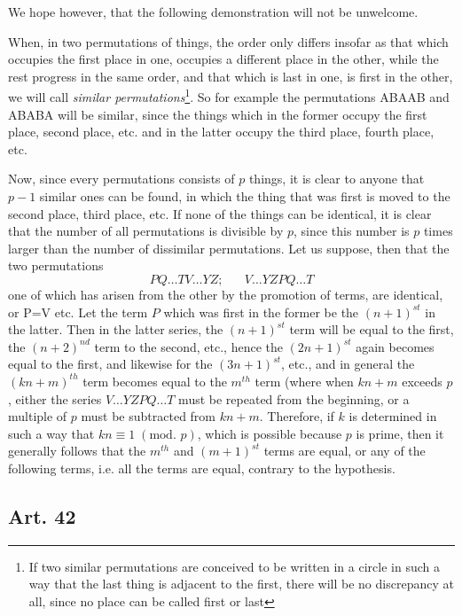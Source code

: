 \documentclass{book}
\theoremstyle{plain}
\theoremstyle{remark}
\begin{document}
We hope however, that the following demonstration will not be unwelcome. 

When, in two permutations of things, the order only differs insofar as that which occupies the first place in one, occupies a different place in the other, while the rest progress in the same order, and that which is last in one, is first in the other, we will call \emph{similar permutations}\footnote{If two similar permutations are conceived to be written in a circle in such a way that the last thing is adjacent to the first, there will be no discrepancy at all, since no place can be called first or last}.  So for example the permutations ABAAB and ABABA will be similar, since the things which in the former occupy the first place, second place, etc. and in the latter occupy the third place, fourth place, etc.

Now, since every permutations consists of $p$ things, it is clear to anyone that $p-1$ similar ones can be found, in which the thing that was first is moved to the second place, third place, etc.  If none of the things can be identical, it is clear that the number of all permutations is divisible by $p$, since this number is $p$ times larger than the number of dissimilar permutations.   Let us suppose, then that the two permutations 
\[ PQ\dots TV \dots YZ; \;\;\;\;\;\; V\dots YZPQ \dots T \]
one of which has arisen from the other by the promotion of terms, are identical, or P=V etc.   Let the term $P$ which was first in the former be the $(n+1)^{st}$ in the latter.  Then in the latter series, the $(n+1)^{st}$ term will be equal to the first, the $(n+2)^{nd}$ term to the second, etc., hence the $(2n+1)^{st}$ again becomes equal to the first, and likewise for the $(3n+1)^{st}$, etc., and in general the $(kn+m)^{th}$ term becomes equal to the $m^{th}$ term (where when $kn+m$ exceeds $p$, either the series $V\dots YZPQ \dots T$ must be repeated from the beginning, or a multiple of $p$ must be subtracted from $kn+m$.  Therefore, if $k$ is determined in such a way that $kn \equiv 1 \; (\textrm{mod. } p)$, which is possible because $p$ is prime, then it generally follows that the $m^{th}$ and $(m+1)^{st}$ terms are equal, or any of the following terms, i.e. all the terms are equal, contrary to the hypothesis.

\subsection*{Art. 42}
\end{document}
